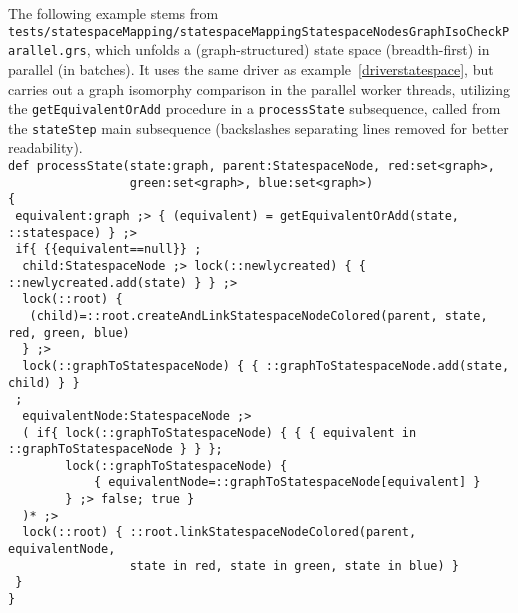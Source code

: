 \begin{example}
The following example stems from \texttt{tests/statespace\-Mapping/statespace\-Mapping\-Statespace\-Nodes\-Graph\-Iso\-Check\-Parallel.grs}, which unfolds a (graph-structured) state space (breadth-first) in parallel (in batches).
It uses the same driver as example~\ref{driverstatespace}, but carries out a graph isomorphy comparison in the parallel worker threads, utilizing the \texttt{getEquivalentOrAdd} procedure in a \texttt{processState} subsequence, called from the \texttt{stateStep} main subsequence (backslashes separating lines removed for better readability).\\
\verb#def processState(state:graph, parent:StatespaceNode, red:set<graph>,#\\
\verb#                 green:set<graph>, blue:set<graph>)#\\
\verb#{#\\
\verb# equivalent:graph ;> { (equivalent) = getEquivalentOrAdd(state, ::statespace) } ;>#\\
\verb# if{ {{equivalent==null}} ;#\\
\verb#  child:StatespaceNode ;> lock(::newlycreated) { { ::newlycreated.add(state) } } ;>#\\
\verb#  lock(::root) { #\\
\verb#   (child)=::root.createAndLinkStatespaceNodeColored(parent, state, red, green, blue)#\\
\verb#  } ;>#\\
\verb#  lock(::graphToStatespaceNode) { { ::graphToStatespaceNode.add(state, child) } }#\\
\verb# ;#\\
\verb#  equivalentNode:StatespaceNode ;>#\\
\verb#  ( if{ lock(::graphToStatespaceNode) { { { equivalent in ::graphToStatespaceNode } } };#\\
\verb#        lock(::graphToStatespaceNode) {#\\
\verb#            { equivalentNode=::graphToStatespaceNode[equivalent] }#\\
\verb#        } ;> false; true }#\\
\verb#  )* ;>#\\
\verb#  lock(::root) { ::root.linkStatespaceNodeColored(parent, equivalentNode,#\\
\verb#                 state in red, state in green, state in blue) }#\\
\verb# }#\\
\verb#}#
\end{example}

